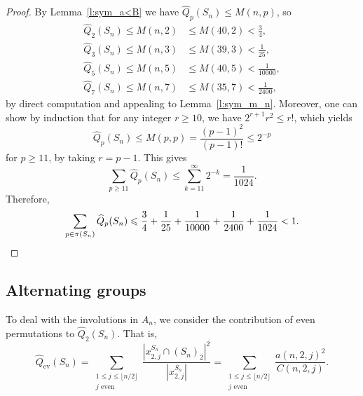 \documentclass[11pt]{amsart}
\numberwithin{equation}{section}
\theoremstyle{definition}
\theoremstyle{remark}
\begin{document}
\begin{proof}
    By Lemma~\ref{l:sym_a<B} we have $\widehat{Q}_p(S_n) \leqslant M(n,p)$, so
    \begin{equation*}
        \begin{aligned}
            \widehat{Q}_2(S_n) \leqslant M(n,2) &\leqslant M(40,2) < \frac{3}{4} , \\
            \widehat{Q}_3(S_n) \leqslant M(n,3) &\leqslant M(39,3) < \frac{1}{25} , \\
            \widehat{Q}_5(S_n) \leqslant M(n,5) &\leqslant M(40,5) < \frac{1}{10000} , \\
            \widehat{Q}_7(S_n) \leqslant M(n,7) &\leqslant M(35,7) < \frac{1}{2400} ,
        \end{aligned}
    \end{equation*}
    by direct computation and appealing to Lemma~\ref{l:sym_m_n}.
    Moreover, one can show by induction that for any integer $r \geqslant 10$, we have $2^{r+1}r^2 \leqslant r!$, which yields
    \begin{equation*}
        \widehat{Q}_p(S_n) \leqslant M(p,p) = \frac{(p-1)^2}{(p-1)!} \leqslant2^{-p}
    \end{equation*}
    for $p \geqslant 11$, by taking $r = p-1$. This gives
    \begin{equation*}
        \sum_{p \geqslant11}\widehat{Q}_p(S_n) \leqslant \sum_{k = 11}^{\infty} 2^{-k} = \frac{1}{1024}.
    \end{equation*}
    Therefore,
    \begin{equation*}
        \sum_{p\in\pi(S_n)} \widehat{Q}_p(S_n) \leqslant \frac{3}{4} + \frac{1}{25} + \frac{1}{10000} +\frac{1}{2400} + \frac{1}{1024} < 1 . \qedhere
    \end{equation*}
\end{proof}

\subsection{Alternating groups}

To deal with the involutions in $A_n$,
we consider the contribution of even permutations to $\widehat{Q}_2(S_n)$.
That is,
\begin{equation*}
    \widehat{Q}_{\mathrm{ev}}(S_n) = \sum_{\substack{1\leqslant j \leqslant\lfloor n/2\rfloor\\ \mbox{$j$ even}}} \frac{|x_{2,j}^{S_n}\cap (S_n)_2|^2}{|x_{2,j}^{S_n}|}
    =
    \sum_{\substack{1\leqslant j \leqslant\lfloor n/2\rfloor\\ \mbox{$j$ even}}} 
    \frac{a(n,2,j)^2}{C(n,2,j)}.
\end{equation*}
\end{document}
